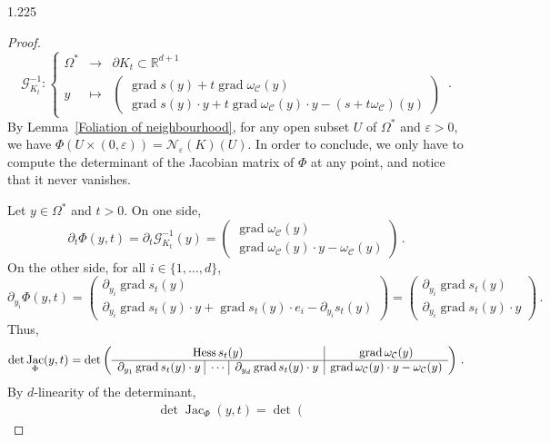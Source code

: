 \documentclass[reqno, a4paper]{amsart}
\numberwithin{equation}{section}
\numberwithin{figure}{section}
\theoremstyle{definition}
\theoremstyle{remark}
\newcommand{\R}{\mathbb{R}} %
\DeclareMathOperator{\grad}{grad} %
\DeclareMathOperator{\Hess}{Hess} %
\DeclareMathOperator{\Jac}{Jac} %
\newcommand{\C}{\mathcal{C}} %
\newcommand{\G}{\mathcal{G}} %
\newcommand{\namelessfunction}[4]{ \left\lbrace \begin{matrix}
{#1} &\longrightarrow& {#2}\\
{#3} & \longmapsto & {#4}
\end{matrix} \right. }
\newcommand{\function}[5]{{#1}: \namelessfunction{#2}{#3}{#4}{#5}}
\begin{document}
\begin{spacing}{1.225}
\begin{proof}
\begin{equation*}
\function{\G_{K_t}^{-1}}{\Omega^*}{\partial K_t \subset \R^{d+1}}{y}{\left(\begin{matrix} \grad s(y)+ t\grad \omega_\C(y) \\ \grad s(y)\cdot y + t \grad \omega_\C (y) \cdot y -(s+t\omega_\C)(y)
\end{matrix}\right)} \, . 
\end{equation*}
By Lemma~\ref{Foliation of neighbourhood}, for any open subset $U$ of $\Omega^*$ and $\varepsilon > 0$, we have $\Phi (U \times (0,\varepsilon))= \mathcal{N}_\varepsilon(K)(U)$. In order to conclude, we only have to compute the determinant of the Jacobian matrix of $\Phi$ at any point, and notice that it never vanishes. 

Let $y\in \Omega^*$ and $t>0$. On one side, 
\begin{equation*}
\partial_t \Phi(y,t) = \partial_t \G_{K_t}^{-1}(y) = \left(\begin{matrix} \grad \omega_\C(y) \\ \grad \omega_\C (y) \cdot y -\omega_\C(y)
\end{matrix}\right) \, . 
\end{equation*}
On the other side, for all $i \in \{1,\dots ,d\}$,
\begin{equation*}
\partial_{y_i} \Phi(y,t) = \left(\begin{matrix} \partial_{y_i}\grad s_t(y) \\ \partial_{y_i} \grad s_t (y) \cdot y + \grad s_t (y) \cdot e_i - \partial_{y_i} s_t(y)
\end{matrix}\right) = \left(\begin{matrix} \partial_{y_i} \grad s_t(y) \\ \partial_{y_i} \grad s_t (y) \cdot y
\end{matrix}\right)\, . 
\end{equation*}
Thus, 
\begin{equation*}
\det \Jac_\Phi(y,t) = \det\left(\begin{array}{c|c}
\Hess s_t(y) & \grad \omega_\C(y)\\ 
\hline \partial_{y_1} \grad s_t (y) \cdot y \ \vline \ \cdots \ \vline \ \partial_{y_d} \grad s_t (y) \cdot y & \grad \omega_\C (y) \cdot y -\omega_\C(y) 
\end{array}\right) \, . 
\end{equation*}
By $d$-linearity of the determinant,
\begin{multline*}
\det \Jac_\Phi(y,t) = \det\left(\begin{array}{c|c|c|c}

\end{array}
\end{multline*}
\end{proof}
\end{spacing}
\end{document}
